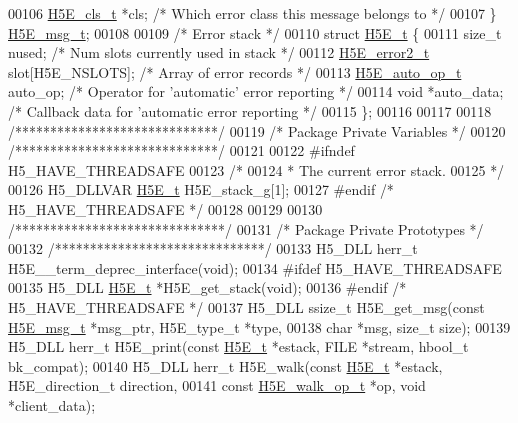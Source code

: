 \begin{DoxyCode}
00106     \hyperlink{struct_h5_e__cls__t}{H5E\_cls\_t}   *cls;           \textcolor{comment}{/* Which error class this message belongs to */}
00107 \} \hyperlink{struct_h5_e__msg__t}{H5E\_msg\_t};
00108 
00109 \textcolor{comment}{/* Error stack */}
00110 \textcolor{keyword}{struct }\hyperlink{struct_h5_e__t}{H5E\_t} \{
00111     \textcolor{keywordtype}{size\_t} nused;               \textcolor{comment}{/* Num slots currently used in stack  */}
00112     \hyperlink{struct_h5_e__error2__t}{H5E\_error2\_t} slot[H5E\_NSLOTS];  \textcolor{comment}{/* Array of error records        */}
00113     \hyperlink{struct_h5_e__auto__op__t}{H5E\_auto\_op\_t} auto\_op;              \textcolor{comment}{/* Operator for 'automatic' error reporting */}
00114     \textcolor{keywordtype}{void} *auto\_data;                    \textcolor{comment}{/* Callback data for 'automatic error reporting */}
00115 \};
00116 
00117 
00118 \textcolor{comment}{/*****************************/}
00119 \textcolor{comment}{/* Package Private Variables */}
00120 \textcolor{comment}{/*****************************/}
00121 
00122 \textcolor{preprocessor}{#ifndef H5\_HAVE\_THREADSAFE}
00123 \textcolor{comment}{/*}
00124 \textcolor{comment}{ * The current error stack.}
00125 \textcolor{comment}{ */}
00126 H5\_DLLVAR \hyperlink{struct_h5_e__t}{H5E\_t}    H5E\_stack\_g[1];
00127 \textcolor{preprocessor}{#endif }\textcolor{comment}{/* H5\_HAVE\_THREADSAFE */}\textcolor{preprocessor}{}
00128 
00129 
00130 \textcolor{comment}{/******************************/}
00131 \textcolor{comment}{/* Package Private Prototypes */}
00132 \textcolor{comment}{/******************************/}
00133 H5\_DLL herr\_t H5E\_\_term\_deprec\_interface(\textcolor{keywordtype}{void});
00134 \textcolor{preprocessor}{#ifdef H5\_HAVE\_THREADSAFE}
00135 H5\_DLL \hyperlink{struct_h5_e__t}{H5E\_t} *H5E\_get\_stack(\textcolor{keywordtype}{void});
00136 \textcolor{preprocessor}{#endif }\textcolor{comment}{/* H5\_HAVE\_THREADSAFE */}\textcolor{preprocessor}{}
00137 H5\_DLL ssize\_t H5E\_get\_msg(\textcolor{keyword}{const} \hyperlink{struct_h5_e__msg__t}{H5E\_msg\_t} *msg\_ptr, H5E\_type\_t *type,
00138     \textcolor{keywordtype}{char} *msg, \textcolor{keywordtype}{size\_t} size);
00139 H5\_DLL herr\_t H5E\_print(\textcolor{keyword}{const} \hyperlink{struct_h5_e__t}{H5E\_t} *estack, FILE *stream, hbool\_t bk\_compat);
00140 H5\_DLL herr\_t H5E\_walk(\textcolor{keyword}{const} \hyperlink{struct_h5_e__t}{H5E\_t} *estack, H5E\_direction\_t direction,
00141     \textcolor{keyword}{const} \hyperlink{struct_h5_e__walk__op__t}{H5E\_walk\_op\_t} *op, \textcolor{keywordtype}{void} *client\_data);

\end{DoxyCode}
